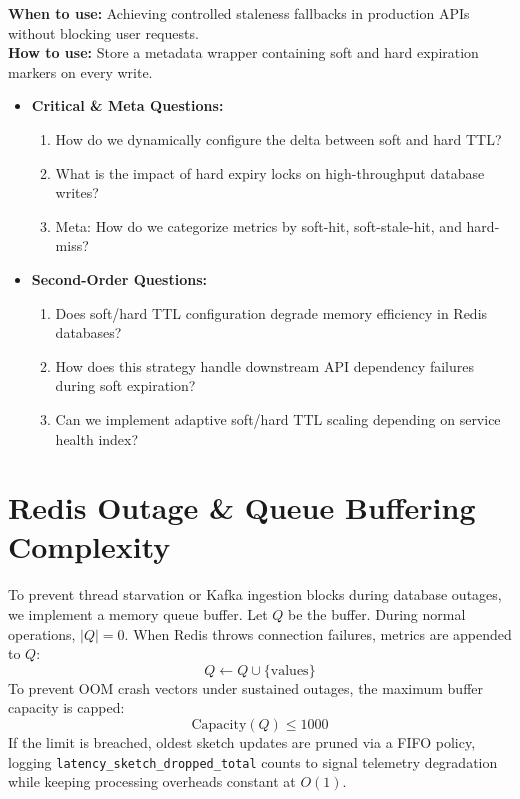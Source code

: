 \documentclass[11pt,a4paper]{article}
\theoremstyle{definition}
\begin{document}
\noindent
\textbf{When to use:} Achieving controlled staleness fallbacks in production APIs without blocking user requests.\\
\textbf{How to use:} Store a metadata wrapper containing soft and hard expiration markers on every write.
\begin{itemize}[leftmargin=*]
  \item[] \textbf{Critical \& Meta Questions:}
  \begin{enumerate}
    \item How do we dynamically configure the delta between soft and hard TTL?
    \item What is the impact of hard expiry locks on high-throughput database writes?
    \item Meta: How do we categorize metrics by soft-hit, soft-stale-hit, and hard-miss?
  \end{enumerate}
  \item[] \textbf{Second-Order Questions:}
  \begin{enumerate}
    \item Does soft/hard TTL configuration degrade memory efficiency in Redis databases?
    \item How does this strategy handle downstream API dependency failures during soft expiration?
    \item Can we implement adaptive soft/hard TTL scaling depending on service health index?
  \end{enumerate}
\end{itemize}
\medskip


\section{Redis Outage \& Queue Buffering Complexity}\label{sec:redis-outage}
To prevent thread starvation or Kafka ingestion blocks during database outages, we implement a memory queue buffer. Let $Q$ be the buffer. During normal operations, $|Q| = 0$. When Redis throws connection failures, metrics are appended to $Q$:
\begin{equation}
Q \leftarrow Q \cup \{ \text{values} \}
\end{equation}
To prevent OOM crash vectors under sustained outages, the maximum buffer capacity is capped:
\begin{equation}
\text{Capacity}(Q) \le 1000
\end{equation}
If the limit is breached, oldest sketch updates are pruned via a FIFO policy, logging \texttt{latency\_sketch\_dropped\_total} counts to signal telemetry degradation while keeping processing overheads constant at $O(1)$.
\end{document}
